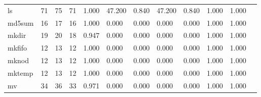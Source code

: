 \begin{longtable}{lp{1.00cm}p{1.00cm}p{1.00cm}p{1.00cm}p{1.00cm}p{1.00cm}p{1.00cm}p{1.00cm}p{1.00cm}p{1.00cm}p{1.00cm}}
ls        &                           71 &                 75 &                                71 &                                      1.000 &                                 47.200 &                                        0.840 &                            47.200 &                                   0.840 &                        1.000 &                                        1.000 \\
md5sum    &                           16 &                 17 &                                16 &                                      1.000 &                                  0.000 &                                        0.000 &                             0.000 &                                   0.000 &                        1.000 &                                        1.000 \\
mkdir     &                           19 &                 20 &                                18 &                                      0.947 &                                  0.000 &                                        0.000 &                             0.000 &                                   0.000 &                        1.000 &                                        1.000 \\
mkfifo    &                           12 &                 13 &                                12 &                                      1.000 &                                  0.000 &                                        0.000 &                             0.000 &                                   0.000 &                        1.000 &                                        1.000 \\
mknod     &                           12 &                 13 &                                12 &                                      1.000 &                                  0.000 &                                        0.000 &                             0.000 &                                   0.000 &                        1.000 &                                        1.000 \\
mktemp    &                           12 &                 13 &                                12 &                                      1.000 &                                  0.000 &                                        0.000 &                             0.000 &                                   0.000 &                        1.000 &                                        1.000 \\
mv        &                           34 &                 36 &                                33 &                                      0.971 &                                  0.000 &                                        0.000 &                             0.000 &                                   0.000 &                        1.000 &                                        1.000 \\

\end{longtable}
